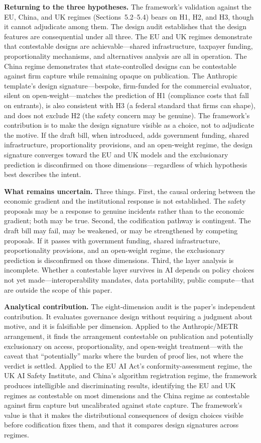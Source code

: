 \textbf{Returning to the three hypotheses.} The framework's validation against the EU, China, and UK regimes (Sections~5.2--5.4) bears on H1, H2, and H3, though it cannot adjudicate among them. The design audit establishes that the design features are consequential under all three. The EU and UK regimes demonstrate that contestable designs are achievable---shared infrastructure, taxpayer funding, proportionality mechanisms, and alternatives analysis are all in operation. The China regime demonstrates that state-controlled designs can be contestable against firm capture while remaining opaque on publication. The Anthropic template's design signature---bespoke, firm-funded for the commercial evaluator, silent on open-weight---matches the prediction of H1 (compliance costs that fall on entrants), is also consistent with H3 (a federal standard that firms can shape), and does not exclude H2 (the safety concern may be genuine). The framework's contribution is to make the design signature visible as a choice, not to adjudicate the motive. If the draft bill, when introduced, adds government funding, shared infrastructure, proportionality provisions, and an open-weight regime, the design signature converges toward the EU and UK models and the exclusionary prediction is disconfirmed on those dimensions---regardless of which hypothesis best describes the intent.

\textbf{What remains uncertain.} Three things. First, the causal ordering between the economic gradient and the institutional response is not established. The safety proposals may be a response to genuine incidents rather than to the economic gradient; both may be true. Second, the codification pathway is contingent. The draft bill may fail, may be weakened, or may be strengthened by competing proposals. If it passes with government funding, shared infrastructure, proportionality provisions, and an open-weight regime, the exclusionary prediction is disconfirmed on those dimensions. Third, the layer analysis is incomplete. Whether a contestable layer survives in AI depends on policy choices not yet made---interoperability mandates, data portability, public compute---that are outside the scope of this paper.

\textbf{Analytical contribution.} The eight-dimension audit is the paper's independent contribution. It evaluates governance design without requiring a judgment about motive, and it is falsifiable per dimension. Applied to the Anthropic/METR arrangement, it finds the arrangement contestable on publication and potentially exclusionary on access, proportionality, and open-weight treatment---with the caveat that ``potentially'' marks where the burden of proof lies, not where the verdict is settled. Applied to the EU AI Act's conformity-assessment regime, the UK AI Safety Institute, and China's algorithm registration regime, the framework produces intelligible and discriminating results, identifying the EU and UK regimes as contestable on most dimensions and the China regime as contestable against firm capture but uncalibrated against state capture. The framework's value is that it makes the distributional consequences of design choices visible before codification fixes them, and that it compares design signatures across regimes.

